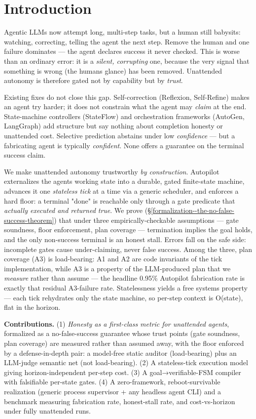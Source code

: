 \section{Introduction}\label{introduction}

Agentic LLMs now attempt long, multi-step tasks, but a human still babysits: watching, correcting,
telling the agent the next step. Remove the human and one failure dominates --- the agent declares
success it never checked. This is worse than an ordinary error: it is a \emph{silent, corrupting} one,
because the very signal that something is wrong (the human\textquotesingle s glance) has been removed. Unattended
autonomy is therefore gated not by capability but by \emph{trust}.

Existing fixes do not close this gap. Self-correction (Reflexion, Self-Refine) makes an agent try
harder; it does not constrain what the agent may \emph{claim} at the end. State-machine controllers
(StateFlow) and orchestration frameworks (AutoGen, LangGraph) add structure but say nothing about
completion honesty or unattended cost. Selective prediction abstains under low \emph{confidence} --- but a
fabricating agent is typically \emph{confident}. None offers a guarantee on the terminal success claim.

We make unattended autonomy trustworthy \emph{by construction}. Autopilot externalizes the agent\textquotesingle s working
state into a durable, gated finite-state machine, advances it one \emph{stateless tick} at a time via a
generic scheduler, and enforces a hard floor: a terminal "done" is reachable only through a gate
predicate that \emph{actually executed and returned true}. We prove (\S\ref{formalization--the-no-false-success-theorem}) that under three
empirically-checkable assumptions --- gate soundness, floor enforcement, plan coverage --- termination
implies the goal holds, and the only non-success terminal is an honest stall. Errors fall on the safe
side: incomplete gates cause under-claiming, never false success. Among the three, plan coverage (A3)
is load-bearing: A1 and A2 are code invariants of the tick implementation, while A3 is a property of
the LLM-produced plan that we \emph{measure} rather than assume --- the headline 0.95\% Autopilot
fabrication rate is exactly that residual A3-failure rate. Statelessness yields a free systems
property --- each tick rehydrates only the state machine, so per-step context is O(state), flat in the horizon.

\textbf{Contributions.} (1) \emph{Honesty as a first-class metric for unattended agents}, formalized as
a no-false-success guarantee whose trust points (gate soundness, plan coverage) are measured rather
than assumed away, with the floor enforced by a defense-in-depth pair: a model-free static auditor
(load-bearing) plus an LLM-judge semantic net (not load-bearing). (2) A stateless-tick
execution model giving horizon-independent per-step cost. (3) A goal→verifiable-FSM compiler with
falsifiable per-state gates. (4) A zero-framework, reboot-survivable realization (generic process
supervisor + any headless agent CLI) and a benchmark measuring fabrication rate, honest-stall rate,
and cost-vs-horizon under fully unattended runs.

